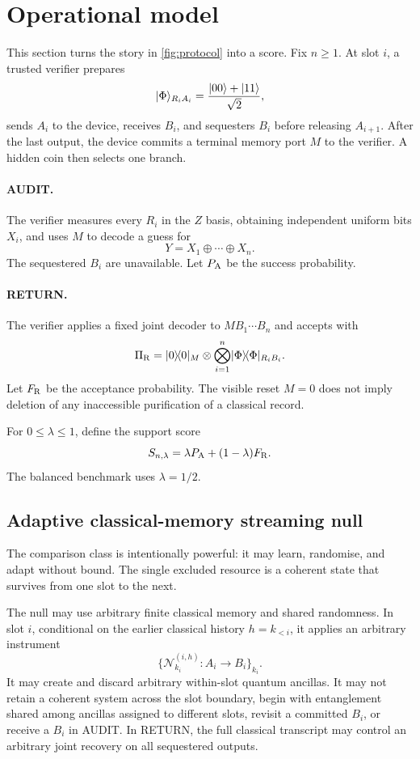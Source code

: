 \section{Operational model}
\label{sec:model}

This section turns the story in \cref{fig:protocol} into a score. Fix $n\geq1$. At slot $i$, a trusted verifier prepares
\[
\lvert \Phi\rangle_{R_iA_i}=\frac{\lvert 00\rangle+\lvert 11\rangle}{\sqrt2},
\]
sends $A_i$ to the device, receives $B_i$, and sequesters $B_i$ before releasing $A_{i+1}$. After the last output, the device commits a terminal memory port $M$ to the verifier. A hidden coin then selects one branch.

\paragraph{AUDIT.}
The verifier measures every $R_i$ in the $Z$ basis, obtaining independent uniform bits $X_i$, and uses $M$ to decode a guess for
\[
Y=X_1\oplus\cdots\oplus X_n.
\]
The sequestered $B_i$ are unavailable. Let $P_{\mathrm A}$ be the success probability.

\paragraph{RETURN.}
The verifier applies a fixed joint decoder to $M B_1\cdots B_n$ and accepts with
\[
\Pi_{\mathrm R}=\lvert 0\rangle\!\langle 0\rvert_M\otimes
\bigotimes_{i=1}^n\lvert \Phi\rangle\!\langle \Phi\rvert_{R_iB_i}.
\]
Let $F_{\mathrm R}$ be the acceptance probability. The visible reset $M=0$ does not imply deletion of any inaccessible purification of a classical record.

For $0\leq\lambda\leq1$, define the support score
\[
S_{n,\lambda}=\lambda P_{\mathrm A}+(1-\lambda)F_{\mathrm R}.
\]
The balanced benchmark uses $\lambda=1/2$.

\subsection{Adaptive classical-memory streaming null}

The comparison class is intentionally powerful: it may learn, randomise, and adapt without bound. The single excluded resource is a coherent state that survives from one slot to the next.

The null may use arbitrary finite classical memory and shared randomness. In slot $i$, conditional on the earlier classical history $h=k_{<i}$, it applies an arbitrary instrument
\[
\{\mathcal N^{(i,h)}_{k_i}:A_i\rightarrow B_i\}_{k_i}.
\]
It may create and discard arbitrary within-slot quantum ancillas. It may not retain a coherent system across the slot boundary, begin with entanglement shared among ancillas assigned to different slots, revisit a committed $B_i$, or receive a $B_i$ in AUDIT. In RETURN, the full classical transcript may control an arbitrary joint recovery on all sequestered outputs.

